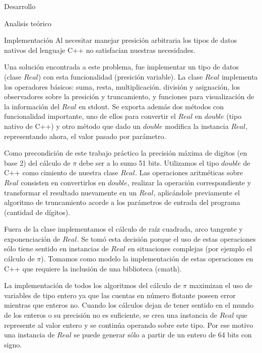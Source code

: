 \begin{section}{Desarrollo}
	\begin{subsection}{Analisis teórico}
			
		
		\newpage
		
		\newpage
		
		
	\end{subsection}
	\begin{subsection}{Implementación}
		Al necesitar manejar presición arbitraria los tipos de datos nativos del lenguaje C++ no satisfacían nuestras necesidades.
		
		Una solución encontrada a este problema, fue implementar un tipo de datos (clase $Real$) con esta funcionalidad (presición variable). La clase $Real$ implementa los operadores básicos: suma, resta, multiplicación. división y asignación, los observadores sobre la presición y truncamiento, y funciones para visualización de la información del $Real$ en stdout. Se exporta además dos métodos con funcionalidad importante, uno de ellos para convertir el $Real$ en $double$ (tipo nativo de C++) y otro método que dado un $double$ modifica la instancia $Real$, representando ahora, el valor pasado por parámetro.
		
		Como precondición de este trabajo práctico la precisión máxima de digitos (en base 2) del cálculo de $\pi$ debe ser a lo sumo 51 bits.
		Utilizamos el tipo $double$ de C++ como cimiento de nuestra clase $Real$. Las operaciones aritméticas sobre $Real$ consisten en convertirlos en $double$, realizar la operación correspondiente y transformar el resultado nuevamente en un $Real$, aplicándole previamente el algoritmo de truncamiento
		acorde a los parámetros de entrada del programa (cantidad de dígitos).
		
		Fuera de la clase implementamos el cálculo de raíz cuadrada, arco tangente y exponenciación de $Real$. Se tomó esta decisión porque el uso de estas operaciones sólo tiene sentido en instancias de $Real$ en situaciones complejas (por ejemplo el cálculo de $\pi$). Tomamos como modelo la implementación de estas operaciones en C++ que requiere la inclusión de una biblioteca (cmath).
		
		La implementación de todos los algoritmos del cálculo de $\pi$ maximizan el uso de variables de tipo entero ya que las cuentas en número flotante poseen error mientras que enteros no. Cuando los cálculos dejan de tener sentido en el mundo de los enteros o su precisión no es suficiente, se crea una instancia de $Real$ que represente al valor entero y se continúa operando sobre este tipo. Por ese motivo una instancia de $Real$ se puede generar sólo a partir de un entero de 64 bits con signo.\\
		

\end{subsection}
\end{section}
